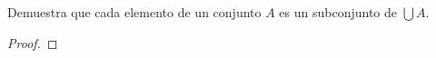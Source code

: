 Demuestra que cada elemento de un conjunto \( A \) es un subconjunto 
de \( \bigcup A \).
\begin{proof}
    
\end{proof}
